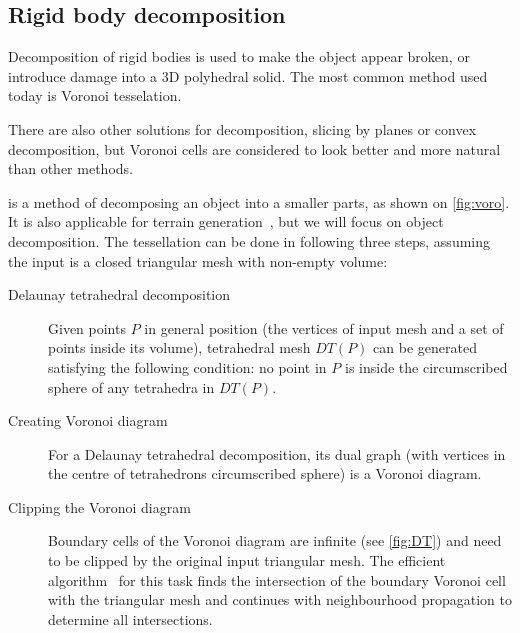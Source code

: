 \subsection{Rigid body decomposition}

Decomposition of rigid bodies is used to make the object appear broken, or introduce damage into a 3D polyhedral solid. The most common method used today is Voronoi tesselation.

There are also other solutions for decomposition, \eg slicing by planes or convex decomposition, but Voronoi cells are considered to look better and more natural than other methods. 

 is a method of decomposing an object into a smaller parts, as shown on \cref{fig:voro}. It is also applicable for \eg terrain generation~\cite{voronoiterrainrealtime}, but we will focus on object decomposition. The tessellation can be done in following three steps, assuming the input is a closed triangular mesh with non-empty volume:
\begin{description}
    \item[Delaunay tetrahedral decomposition] Given points $P$ in general position (the vertices of input mesh and a set of points inside its volume), tetrahedral mesh $DT(P)$ can be generated satisfying the following condition: no point in $P$ is inside the circumscribed sphere of any tetrahedra in $DT(P)$.
    \item[Creating Voronoi diagram] For a Delaunay tetrahedral decomposition, its dual graph (with vertices in the centre of tetrahedrons circumscribed sphere) is a Voronoi diagram.
    \item[Clipping the Voronoi diagram] Boundary cells of the Voronoi diagram are infinite (see \cref{fig:DT}) and need to be clipped by the original input triangular mesh. The efficient algorithm~\cite{yan2010efficient} for this task finds the intersection of the boundary Voronoi cell with the triangular mesh and continues with neighbourhood propagation to determine all intersections. 
\end{description}

